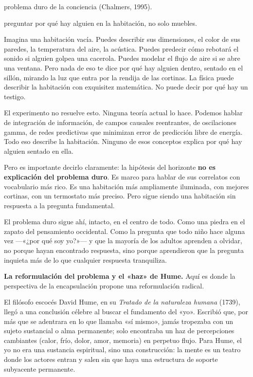 \begin{fisica}
 problema duro de la conciencia (Chalmers, 1995).

 preguntar por qué hay alguien en la habitación, no solo muebles.
\end{fisica}
Imagina una habitación vacía. Puedes describir sus dimensiones, el color de sus paredes, la temperatura del aire, la acústica. Puedes predecir cómo rebotará el sonido si alguien golpea una cacerola. Puedes modelar el flujo de aire si se abre una ventana. Pero nada de eso te dice por qué hay alguien dentro, sentado en el sillón, mirando la luz que entra por la rendija de las cortinas. La física puede describir la habitación con exquisitez matemática. No puede decir por qué hay un testigo.

El experimento no resuelve esto. Ninguna teoría actual lo hace. Podemos hablar de integración de información, de campos causales reentrantes, de oscilaciones gamma, de redes predictivas que minimizan error de predicción libre de energía. Todo eso describe la habitación. Ninguno de esos conceptos explica por qué hay alguien sentado en ella.

Pero es importante decirlo claramente: la hipótesis del horizonte \textbf{no es explicación del problema duro}. Es marco para hablar de sus correlatos con vocabulario más rico. Es una habitación más ampliamente iluminada, con mejores cortinas, con un termostato más preciso. Pero sigue siendo una habitación sin respuesta a la pregunta fundamental.

El problema duro sigue ahí, intacto, en el centro de todo. Como una piedra en el zapato del pensamiento occidental. Como la pregunta que todo niño hace alguna vez —«¿por qué soy yo?»— y que la mayoría de los adultos aprenden a olvidar, no porque hayan encontrado respuesta, sino porque aprendieron que la pregunta inquieta más de lo que cualquier respuesta tranquiliza.

\textbf{La reformulación del problema y el «haz» de Hume.} Aquí es donde la perspectiva de la encapsulación propone una reformulación radical.

El filósofo escocés David Hume, en su \emph{Tratado de la naturaleza humana} (1739), llegó a una conclusión célebre al buscar el fundamento del «yo». Escribió que, por más que se adentrara en lo que llamaba «sí mismo», jamás tropezaba con un sujeto sustancial o alma permanente; solo encontraba un haz de percepciones cambiantes (calor, frío, dolor, amor, memoria) en perpetuo flujo. Para Hume, el yo no era una sustancia espiritual, sino una construcción: la mente es un teatro donde los actores entran y salen sin que haya una estructura de soporte subyacente permanente.

